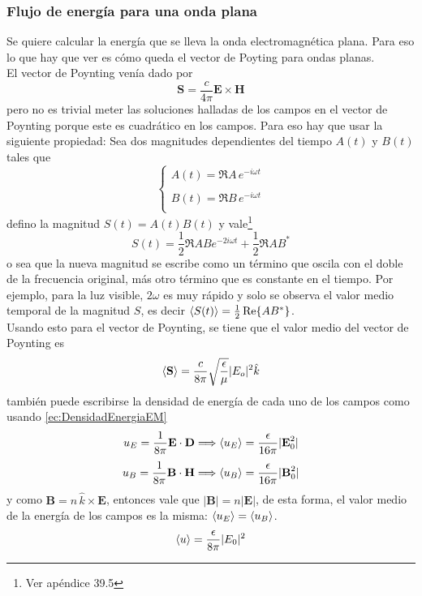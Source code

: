\subsubsection{Flujo de energía para una onda plana}
Se quiere calcular la energía que se lleva la onda electromagnética plana. Para eso lo que hay que ver es cómo queda el vector de Poyting para ondas planas.\\
\indent El vector de Poynting venía dado por
\begin{equation*}
    \textbf{S} = \frac{c}{4\pi}\textbf{E}\times \textbf{H}
\end{equation*}
pero no es trivial meter las soluciones halladas de los campos en el vector de Poynting porque este es cuadrático en los campos. Para eso hay que usar la siguiente propiedad: Sea dos magnitudes dependientes del tiempo $A(t)$ y $B(t)$ tales que
\begin{equation*}
    \left\{
        \begin{matrix}
            A(t) = \Re{A\,e^{-i\omega t}}\\
            \\
            B(t) = \Re{B\,e^{-i\omega t}}\\
        \end{matrix}
    \right.
\end{equation*}
defino la magnitud $S(t) = A(t)B(t)$ y vale\footnote{Ver apéndice 39.5}
\begin{equation*}
    S(t) = \frac{1}{2}\Re{ABe^{-2i\omega t}} + \frac{1}{2}\Re{AB^{*}}
\end{equation*}
o sea que la nueva magnitud se escribe como un término que oscila con el doble de la frecuencia original, más otro término que es constante en el tiempo. Por ejemplo, para la luz visible, $2\omega$ es muy rápido y solo se observa el valor medio temporal de la magnitud $S$, es decir $\left\langle S(t) \right\rangle = \frac{1}{2}\Re{AB^{*}}$.\\
\indent Usando esto para el vector de Poynting, se tiene que el valor medio del vector de Poynting es
\begin{equation*}
    \left\langle \textbf{S} \right\rangle
    = \frac{c}{8\pi}
    \sqrt{\frac{\epsilon}{\mu}}|E_{o}|^{2}\hat{k}
\end{equation*}
también puede escribirse la densidad de energía de cada uno de los campos como usando \eqref{ec:DensidadEnergiaEM}
\begin{equation*}
    u_{E} 
    = \frac{1}{8\pi} \textbf{E}\cdot \textbf{D}
    \Longrightarrow \left\langle u_{E} \right\rangle = \frac{\epsilon}{16\pi}|\textbf{E}_{0}^{2}|
\end{equation*}
\begin{equation*}
    u_{B} 
    = \frac{1}{8\pi} \textbf{B}\cdot \textbf{H}
    \Longrightarrow \left\langle u_{B} \right\rangle = \frac{\epsilon}{16\pi}|\textbf{B}_{0}^{2}|
\end{equation*}
y como $\textbf{B} = n\,\hat{k}\times \textbf{E}$, entonces vale que $|\textbf{B}| = n |\textbf{E}|$, de esta forma, el valor medio de la energía de los campos es la misma: $\left\langle u_{E} \right\rangle = \left\langle u_{B} \right\rangle$.
\begin{equation*}
    \left\langle u \right\rangle = \frac{\epsilon}{8\pi}|E_{0}|^{2}
\end{equation*}


